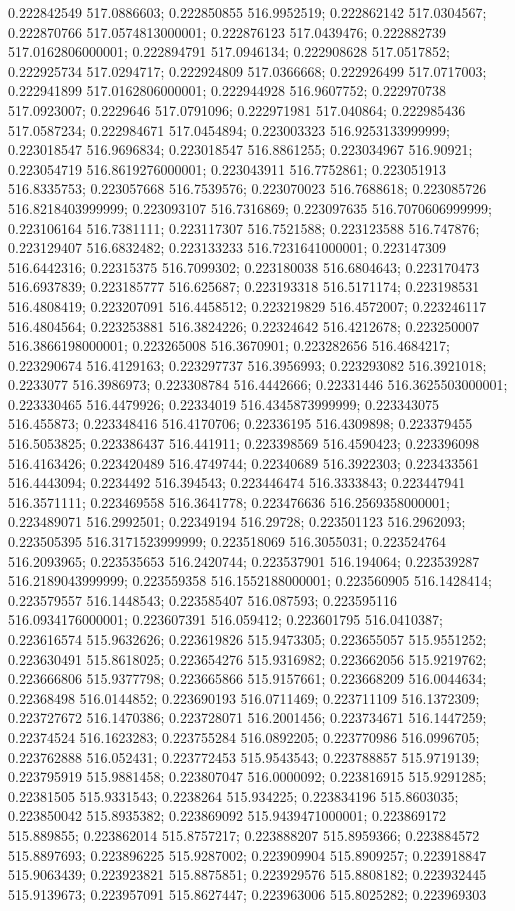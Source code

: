 0.222842549 517.0886603; 0.222850855 516.9952519; 0.222862142 517.0304567; 0.222870766 517.0574813000001; 0.222876123 517.0439476; 0.222882739 517.0162806000001; 0.222894791 517.0946134; 0.222908628 517.0517852; 0.222925734 517.0294717; 0.222924809 517.0366668; 0.222926499 517.0717003; 0.222941899 517.0162806000001; 0.222944928 516.9607752; 0.222970738 517.0923007; 0.2229646 517.0791096; 0.222971981 517.040864; 0.222985436 517.0587234; 0.222984671 517.0454894; 0.223003323 516.9253133999999; 0.223018547 516.9696834; 0.223018547 516.8861255; 0.223034967 516.90921; 0.223054719 516.8619276000001; 0.223043911 516.7752861; 0.223051913 516.8335753; 0.223057668 516.7539576; 0.223070023 516.7688618; 0.223085726 516.8218403999999; 0.223093107 516.7316869; 0.223097635 516.7070606999999; 0.223106164 516.7381111; 0.223117307 516.7521588; 0.223123588 516.747876; 0.223129407 516.6832482; 0.223133233 516.7231641000001; 0.223147309 516.6442316; 0.22315375 516.7099302; 0.223180038 516.6804643; 0.223170473 516.6937839; 0.223185777 516.625687; 0.223193318 516.5171174; 0.223198531 516.4808419; 0.223207091 516.4458512; 0.223219829 516.4572007; 0.223246117 516.4804564; 0.223253881 516.3824226; 0.22324642 516.4212678; 0.223250007 516.3866198000001; 0.223265008 516.3670901; 0.223282656 516.4684217; 0.223290674 516.4129163; 0.223297737 516.3956993; 0.223293082 516.3921018; 0.2233077 516.3986973; 0.223308784 516.4442666; 0.22331446 516.3625503000001; 0.223330465 516.4479926; 0.22334019 516.4345873999999; 0.223343075 516.455873; 0.223348416 516.4170706; 0.22336195 516.4309898; 0.223379455 516.5053825; 0.223386437 516.441911; 0.223398569 516.4590423; 0.223396098 516.4163426; 0.223420489 516.4749744; 0.22340689 516.3922303; 0.223433561 516.4443094; 0.2234492 516.394543; 0.223446474 516.3333843; 0.223447941 516.3571111; 0.223469558 516.3641778; 0.223476636 516.2569358000001; 0.223489071 516.2992501; 0.22349194 516.29728; 0.223501123 516.2962093; 0.223505395 516.3171523999999; 0.223518069 516.3055031; 0.223524764 516.2093965; 0.223535653 516.2420744; 0.223537901 516.194064; 0.223539287 516.2189043999999; 0.223559358 516.1552188000001; 0.223560905 516.1428414; 0.223579557 516.1448543; 0.223585407 516.087593; 0.223595116 516.0934176000001; 0.223607391 516.059412; 0.223601795 516.0410387; 0.223616574 515.9632626; 0.223619826 515.9473305; 0.223655057 515.9551252; 0.223630491 515.8618025; 0.223654276 515.9316982; 0.223662056 515.9219762; 0.223666806 515.9377798; 0.223665866 515.9157661; 0.223668209 516.0044634; 0.22368498 516.0144852; 0.223690193 516.0711469; 0.223711109 516.1372309; 0.223727672 516.1470386; 0.223728071 516.2001456; 0.223734671 516.1447259; 0.22374524 516.1623283; 0.223755284 516.0892205; 0.223770986 516.0996705; 0.223762888 516.052431; 0.223772453 515.9543543; 0.223788857 515.9719139; 0.223795919 515.9881458; 0.223807047 516.0000092; 0.223816915 515.9291285; 0.22381505 515.9331543; 0.2238264 515.934225; 0.223834196 515.8603035; 0.223850042 515.8935382; 0.223869092 515.9439471000001; 0.223869172 515.889855; 0.223862014 515.8757217; 0.223888207 515.8959366; 0.223884572 515.8897693; 0.223896225 515.9287002; 0.223909904 515.8909257; 0.223918847 515.9063439; 0.223923821 515.8875851; 0.223929576 515.8808182; 0.223932445 515.9139673; 0.223957091 515.8627447; 0.223963006 515.8025282; 0.223969303 